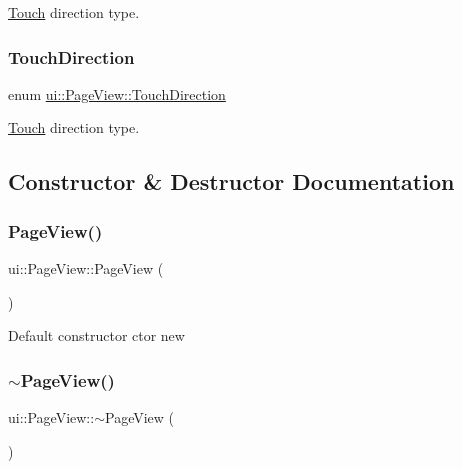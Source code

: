 \hyperlink{classTouch}{Touch} direction type. \mbox{\label{classui_1_1PageView_a95b0e3ff5da243df2a7dfc1c05d7017c}} 
\subsubsection{\texorpdfstring{Touch\+Direction}{TouchDirection}\hspace{0.1cm}{\footnotesize\ttfamily [2/2]}}
{\footnotesize\ttfamily enum \hyperlink{classui_1_1PageView_a95b0e3ff5da243df2a7dfc1c05d7017c}{ui\+::\+Page\+View\+::\+Touch\+Direction}\hspace{0.3cm}{\ttfamily [strong]}}

\hyperlink{classTouch}{Touch} direction type. 

\subsection{Constructor \& Destructor Documentation}
\mbox{\label{classui_1_1PageView_a5b0ef1346c9a4c504162111bd668a826}} 
\subsubsection{\texorpdfstring{Page\+View()}{PageView()}\hspace{0.1cm}{\footnotesize\ttfamily [1/2]}}
{\footnotesize\ttfamily ui\+::\+Page\+View\+::\+Page\+View (\begin{DoxyParamCaption}{ }\end{DoxyParamCaption})}

Default constructor  ctor  new \mbox{\label{classui_1_1PageView_aa52ebe43969bffeb70308a601ce371d0}} 
\subsubsection{\texorpdfstring{$\sim$\+Page\+View()}{~PageView()}\hspace{0.1cm}{\footnotesize\ttfamily [1/2]}}
{\footnotesize\ttfamily ui\+::\+Page\+View\+::$\sim$\+Page\+View (\begin{DoxyParamCaption}{ }\end{DoxyParamCaption})\hspace{0.3cm}{\ttfamily [virtual]}}

